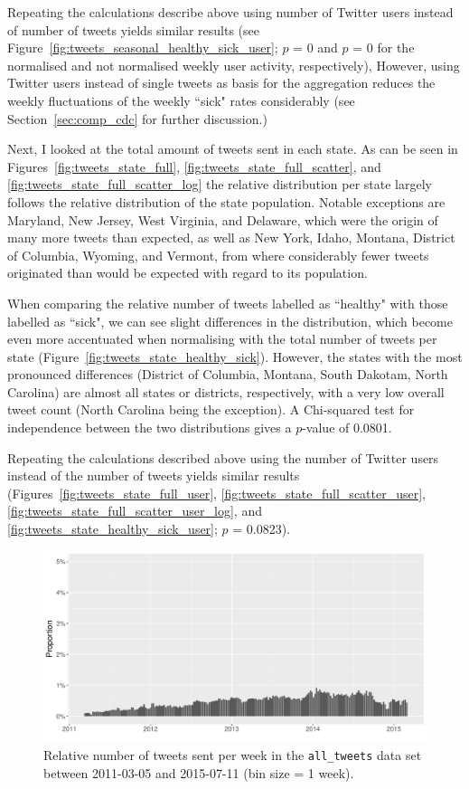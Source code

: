 \documentclass[11pt, a4paper,twoside]{report}\usepackage[]{graphicx}\usepackage[]{color}
\begin{document}
Repeating the calculations describe above using number of Twitter users instead of number of tweets yields similar results (see Figure~\ref{fig:tweets_seasonal_healthy_sick_user}; $p$ = 0 and $p$ = 0 for the normalised and not normalised weekly user activity, respectively), However, using Twitter users instead of single tweets as basis for the aggregation reduces the weekly fluctuations of the weekly ``sick" rates considerably (see Section~\ref{sec:comp_cdc} for further discussion.)

Next, I looked at the total amount of tweets sent in each state. As can be seen in Figures~\ref{fig:tweets_state_full}, \ref{fig:tweets_state_full_scatter}, and \ref{fig:tweets_state_full_scatter_log} the relative distribution per state largely follows the relative distribution of the state population. Notable exceptions are Maryland, New Jersey, West Virginia, and Delaware, which were the origin of many more tweets than expected, as well as New York, Idaho, Montana, District of Columbia, Wyoming, and Vermont, from where considerably fewer tweets originated than would be expected with regard to its population.

When comparing the relative number of tweets labelled as ``healthy" with those labelled as ``sick", we can see slight differences in the distribution, which become even more accentuated when normalising with the total number of tweets per state (Figure~\ref{fig:tweets_state_healthy_sick}). However, the states with the most pronounced differences (District of Columbia, Montana, South Dakotam, North Carolina) are almost all states or districts, respectively, with a very low overall tweet count (North Carolina being the exception). A Chi-squared test for independence between the two distributions gives a $p$-value of 0.0801. 

Repeating the calculations described above using the number of Twitter users instead of the number of tweets yields similar results (Figures~\ref{fig:tweets_state_full_user}, \ref{fig:tweets_state_full_scatter_user}, \ref{fig:tweets_state_full_scatter_user_log}, and \ref{fig:tweets_state_healthy_sick_user}; $p$ = 0.0823).\newpage

\begin{figure}[H]
\centering
\includegraphics[width=1\linewidth]{11_activity_total_date_Twitter_full_aggregated.pdf}
\caption{Relative number of tweets sent per week in the \texttt{all\_tweets} data set between 2011-03-05 and 2015-07-11 (bin size = 1 week).}
\label{fig:tweets_seasonal_full}
\end{figure}
\end{document}
